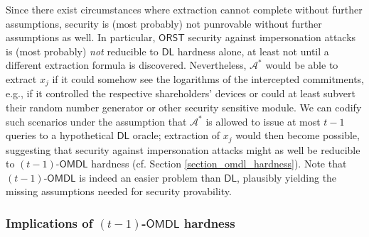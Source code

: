 \documentclass{iacrtrans}
\begin{document}
Since there exist circumstances where
extraction cannot complete without further assumptions,
security is (most probably)
not punrovable without further assumptions as well.
In particular,
$\mathsf{ORST}$ security
against impersonation attacks is (most probably)
\textit{not} reducible to $\mathsf{DL}$ hardness alone,
at least not until a different extraction formula is discovered.
Nevertheless, $\mathcal{A}^*$ would be able to extract $x_j$
if it could somehow see the logarithms
of the intercepted commitments, e.g.,
if it controlled the respective shareholders' devices
or could at least subvert their random number generator
or other security sensitive module.
We can codify such scenarios under the assumption
that $\mathcal{A}^*$ is allowed to issue at most
$t-1$ queries to a hypothetical $\mathsf{DL}$ oracle;
extraction of $x_j$
would then become possible,
suggesting that security against impersonation attacks
might as well be reducible to
$(t-1)$-$\mathsf{OMDL}$ hardness
(cf. Section \ref{section_omdl_hardness}).
Note that $(t-1)$-$\mathsf{OMDL}$ is indeed
an easier problem than $\mathsf{DL}$,
plausibly yielding the missing assumptions needed
for security provability.


\subsubsection{Implications of $(t-1)$-$\mathsf{OMDL}$ hardness}\label{section_omdl_implications}
\end{document}
